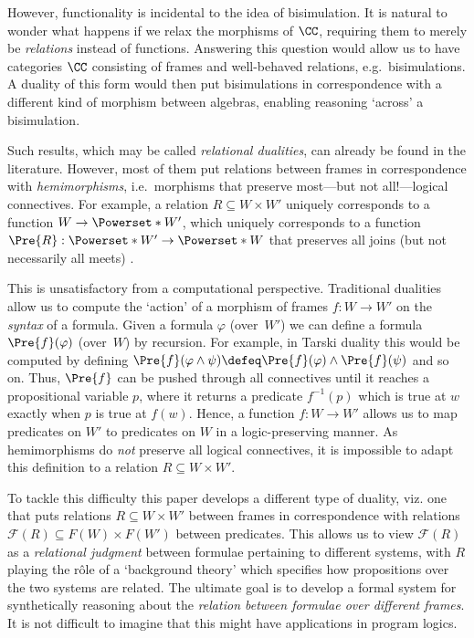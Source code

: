 \documentclass[10pt,a4paper]{article}
\begin{document}
However, functionality is incidental to the idea of bisimulation. It is natural
to wonder what happens if we relax the morphisms of $\CC$, requiring them to
merely be \emph{relations} instead of functions. Answering this question would
allow us to have categories $\CC$ consisting of frames and well-behaved
relations, e.g.\ bisimulations. A duality of this form would then put
bisimulations in correspondence with a different kind of morphism between
algebras, enabling reasoning `across' a bisimulation.

Such results, which may be called \emph{relational dualities}, can already be found
in the literature. However, most of them put relations between frames in
correspondence with \emph{hemimorphisms}, i.e.\ morphisms that preserve
most---but not all!---logical connectives. For example, a relation $R \subseteq
W \times W'$ uniquely corresponds to a function $W \to \Powerset*{W'}$, which uniquely
corresponds to a function $\Pre{R} : \Powerset*{W'} \to \Powerset*{W}$ that
preserves all joins (but not necessarily all meets) \cite{jonsson_1951} \cite[\S
2.3]{kishida_2018}. 

This is unsatisfactory from a computational perspective. Traditional dualities
allow us to compute the `action' of a morphism of frames $f : W \to W'$ on the
\emph{syntax} of a formula. Given a formula $\varphi$ (over~$W'$) we can define
a formula $\Pre{f}(\varphi)$ (over~$W$) by recursion. For example, in Tarski
duality this would be computed by defining $\Pre{f}(\varphi \land \psi) \defeq
\Pre{f}(\varphi) \land \Pre{f}(\psi)$ and so on. Thus, $\Pre{f}$ can be pushed
through all connectives until it reaches a propositional variable $p$, where it
returns a predicate $f^{-1}(p)$ which is true at $w$ exactly when $p$ is true at
$f(w)$. Hence, a function $f : W \to W'$ allows us to map predicates on $W'$ to
predicates on $W$ in a logic-preserving manner. As hemimorphisms do \emph{not}
preserve all logical connectives, it is impossible to adapt this definition to a
relation $R \subseteq W \times W'$.

To tackle this difficulty this paper develops a different type of duality, viz.
one that puts relations $R \subseteq W \times W'$ between frames in
correspondence with relations $\mathcal{F}(R) \subseteq F(W) \times F(W')$
between predicates. This allows us to view $\mathcal{F}(R)$ as a
\emph{relational judgment} between formulae pertaining to different systems,
with $R$ playing the r\^{o}le of a `background theory' which specifies how
propositions over the two systems are related. The ultimate goal is to develop a
formal system for synthetically reasoning about the \emph{relation between
formulae over different frames}. It is not difficult to imagine that this might
have applications in program logics.
\end{document}
